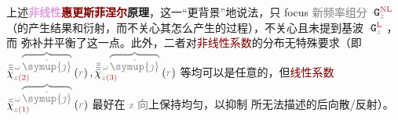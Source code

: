 上述\textbf{\textcolor{Plum}{非线性}\textcolor{Maroon}{惠更斯菲涅尔}原理}，这一“更背景”地说法，只 focus \textcolor{gray}{新频率组分} $\xint{\mathcolor{gray}{-}}{16}{\mathtt{G}}^{\text{\textcolor{Maroon}{NL}}}_{\mathcolor{gray}{z}}$（的\textcolor{NavyBlue}{产生}结果和\textcolor{NavyBlue}{衍射}，而不关心其怎么\textcolor{NavyBlue}{产生}的过程），不关心且未提到\textcolor{NavyBlue}{基波} $\xint{\mathcolor{gray}{-}}{16}{\mathtt{G}}^{\text{\textcolor{Maroon}{L}}}_{\mathcolor{gray}{z}}$ ，而  弥补并平衡了这一点。此外，二者对\textcolor{Maroon}{非线性系数}的分布无特殊要求（即 $\bar{\bar{\bar{\chi}}}^{\;\! \mathcolor{gray}{\omega} \mathcolor{gray}{\overbrace{\check{\symup{\jmath}}}}}_{\mathcolor{gray}{z} \textcolor{Maroon}{(2)}} \left( \textcolor{gray}{r} \right), \bar{\bar{\bar{\bar{\chi}}}}^{\;\! \mathcolor{gray}{\omega} \mathcolor{gray}{\overbrace{\check{\symup{\jmath}}}}}_{\mathcolor{gray}{z} \textcolor{Maroon}{(3)}} \left( \textcolor{gray}{r} \right)$ 等均可以是任意的，但\textcolor{Maroon}{线性系数} $\bar{\bar{\chi}}^{\;\! \mathcolor{gray}{\omega} \mathcolor{gray}{\overbrace{\check{\symup{\jmath}}}}}_{\mathcolor{gray}{z} \textcolor{Maroon}{(1)}} \left( \textcolor{gray}{r} \right)$ 最好在 \textcolor{gray}{z 向}上保持均匀，以抑制  所无法描述的后向\textcolor{NavyBlue}{散}/\textcolor{NavyBlue}{反射}）。

